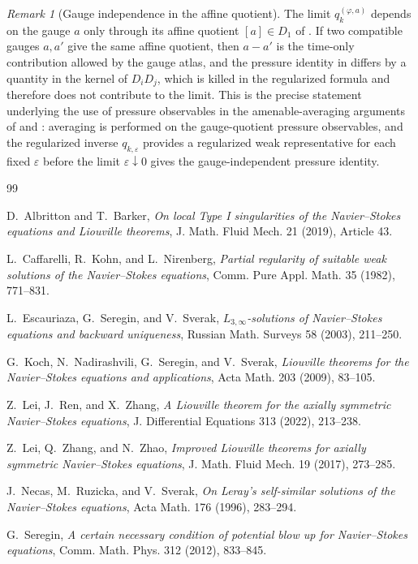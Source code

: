\documentclass[11pt]{amsart}
\numberwithin{equation}{section}
\theoremstyle{plain}
\theoremstyle{definition}
\theoremstyle{remark}
\newtheorem{remark}[remark]{Remark}
\begin{document}
\begin{remark}[Gauge independence in the affine quotient]
\label{rem:generator-gauge-independence}
The limit \(q_k^{(\varphi,a)}\) depends on the gauge \(a\) only through
its affine quotient \([a]\in D_1\) of
.  If two compatible gauges
\(a,a'\) give the same affine quotient, then \(a-a'\) is the time-only
contribution allowed by the gauge atlas, and the pressure identity in
 differs by a quantity in the
kernel of \(D_iD_j\), which is killed in the regularized formula and
therefore does not contribute to the limit.  This is the precise
statement underlying the use of pressure observables in the
amenable-averaging arguments of
 and
: averaging is performed on the
gauge-quotient pressure observables, and the regularized inverse
\(q_{k,\varepsilon}\) provides a regularized weak representative for each fixed
\(\varepsilon\) before the limit \(\varepsilon\downarrow0\) gives the
gauge-independent pressure identity.
\end{remark}

\begin{thebibliography}{99}

D.~Albritton and T.~Barker,
\emph{On local Type I singularities of the Navier--Stokes equations and
Liouville theorems},
J. Math. Fluid Mech. 21 (2019), Article 43.

L.~Caffarelli, R.~Kohn, and L.~Nirenberg,
\emph{Partial regularity of suitable weak solutions of the Navier--Stokes
equations},
Comm. Pure Appl. Math. 35 (1982), 771--831.

L.~Escauriaza, G.~Seregin, and V.~Sverak,
\emph{\(L_{3,\infty}\)-solutions of Navier--Stokes equations and backward
uniqueness},
Russian Math. Surveys 58 (2003), 211--250.

G.~Koch, N.~Nadirashvili, G.~Seregin, and V.~Sverak,
\emph{Liouville theorems for the Navier--Stokes equations and applications},
Acta Math. 203 (2009), 83--105.

Z.~Lei, J.~Ren, and X.~Zhang,
\emph{A Liouville theorem for the axially symmetric Navier--Stokes equations},
J. Differential Equations 313 (2022), 213--238.

Z.~Lei, Q.~Zhang, and N.~Zhao,
\emph{Improved Liouville theorems for axially symmetric Navier--Stokes
equations},
J. Math. Fluid Mech. 19 (2017), 273--285.

J.~Necas, M.~Ruzicka, and V.~Sverak,
\emph{On Leray's self-similar solutions of the Navier--Stokes equations},
Acta Math. 176 (1996), 283--294.

G.~Seregin,
\emph{A certain necessary condition of potential blow up for Navier--Stokes
equations},
Comm. Math. Phys. 312 (2012), 833--845.

\end{thebibliography}
\end{document}
